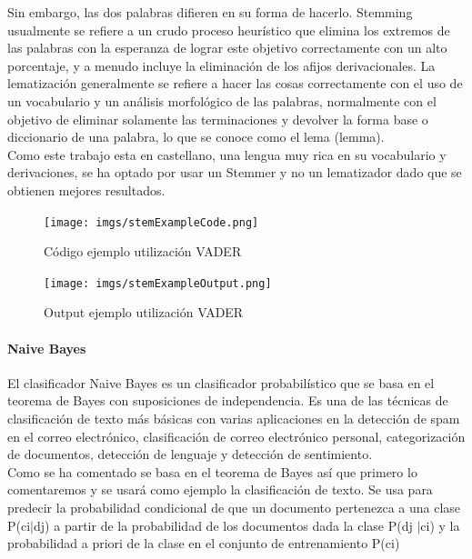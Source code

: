 \documentclass[../all.tex]{subfiles}
\begin{document}
        	Sin embargo, las dos palabras difieren en su forma de hacerlo. Stemming usualmente se refiere a un crudo proceso heurístico que elimina los extremos de las palabras con la esperanza de lograr este objetivo correctamente con un alto porcentaje, y a menudo incluye la eliminación de los afijos derivacionales. La lematización generalmente se refiere a hacer las cosas correctamente con el uso de un vocabulario y un análisis morfológico de las palabras, normalmente con el objetivo de eliminar solamente las terminaciones  y devolver la forma base o diccionario de una palabra, lo que se conoce como el lema (lemma).\\
        	
        	Como este trabajo esta en castellano, una lengua muy rica en su vocabulario y derivaciones, se ha optado por usar un Stemmer y no un lematizador dado que se obtienen mejores resultados.\\
        	
        	\begin{figure}[H]
        		\centering
        		\texttt{[image: imgs/stemExampleCode.png]}
        		\caption{Código ejemplo utilización VADER}
        	\end{figure}
        	\begin{figure}[H]
        		\centering
        		\texttt{[image: imgs/stemExampleOutput.png]}
        		\caption{Output ejemplo utilización VADER}
        	\end{figure}
        	
        	

        \paragraph{Naive Bayes}
        
        	El clasificador Naive Bayes es un clasificador probabilístico que se basa en el teorema de Bayes con suposiciones de independencia. Es una de las técnicas de clasificación de texto más básicas con varias aplicaciones en la detección de spam en el correo electrónico, clasificación de correo electrónico personal, categorización de documentos, detección de lenguaje y detección de sentimiento. \\
        	
        	Como se ha comentado se basa en el teorema de Bayes así que primero lo comentaremos y se usará como ejemplo la clasificación de texto. Se usa para predecir la probabilidad condicional de que un documento pertenezca a una clase P(c{\tiny i}$|$d{\tiny j}) a partir de la probabilidad de los documentos dada la clase P(d{\tiny j} $|$c{\tiny i}) y la probabilidad a priori de la clase en el conjunto de entrenamiento P(c{\tiny i})
        	
\end{document}
